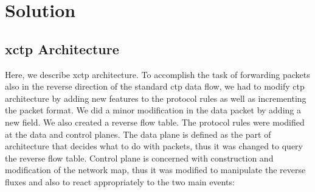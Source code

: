 \section{Solution}
\label{sec:solution}


\subsection{\ac{xctp} Architecture}
\label{sec:architecture}


Here, we describe \ac{xctp} architecture. To accomplish the task of forwarding packets also in the reverse direction of the standard \ac{ctp} data flow, we had to modify \ac{ctp} architecture by adding new features to the protocol rules as well as incrementing the packet format. We did a minor modification in the data packet by adding a new field. We also created a reverse flow table. The protocol rules were modified at the data and control planes. The data plane is defined as the part of architecture that decides what to do with packets, thus it was changed to query the reverse flow table. Control plane is concerned with construction and modification of the network map, thus it was modified to manipulate the reverse fluxes and also to react appropriately to the two main events:


 


